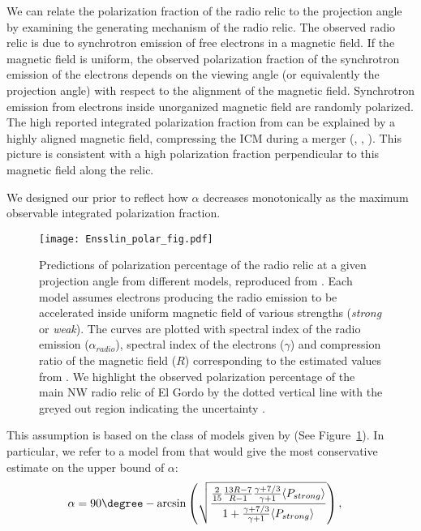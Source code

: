 We can relate the polarization fraction of the radio relic to the
projection angle by examining the
generating mechanism of the radio relic.
The observed radio relic is due to synchrotron emission of free electrons in a
magnetic field. If the magnetic field is uniform, the observed
polarization fraction of the synchrotron emission of the electrons depends on the
viewing angle (or equivalently the projection angle) with respect to the alignment of the magnetic field. 
Synchrotron emission from electrons inside unorganized magnetic field are
randomly polarized. The high reported integrated polarization fraction from
\citet{L13} can be explained by a highly aligned magnetic field,
compressing the ICM during a merger
(\citealt{E98}, \citealt{vanWeeren10}, \citealt{Feretti12}).
This picture is consistent with a high polarization fraction perpendicular
to this magnetic field along the relic. 
\par
We designed our prior to reflect how $\alpha$ decreases monotonically as the
maximum observable integrated polarization fraction. 
\begin{figure}
	\texttt{[image: Ensslin\_polar\_fig.pdf]}
	\caption{Predictions of polarization percentage of the radio relic at a
		given projection angle from different models, reproduced from
		\citealt{E98}. Each model assumes electrons producing the radio emission
		to be accelerated inside uniform magnetic field of various strengths ({\it strong} or 
		{\it weak}). The curves are plotted with spectral index of the radio emission
		($\alpha_{radio}$), spectral index of the electrons ($\gamma$) and
		compression ratio of the magnetic field ($R$) corresponding to the
		estimated values from \citet{L13}.
		We highlight the observed polarization percentage of the main NW radio relic
		of El Gordo by the dotted vertical line with the greyed out region
		indicating the uncertainty \citep{L13}.\label{fig:Ensslin_fig}}
\end{figure}
This assumption is based on the class of models given by \cite{E98}(See
Figure~\ref{fig:Ensslin_fig}). In particular, we refer to a model from \cite{E98} 
that would give the most
conservative estimate on the upper bound of $\alpha$:
\begin{align}
\alpha &= 90 \degree -
\arcsin
\left(
\sqrt{
\frac{
	\frac{2}{15} \frac{13R - 7}{R - 1} \frac{\gamma + 7/3}{\gamma + 1}
	\langle P_{strong} \rangle}{
	1 + \frac{\gamma + 7/3}{ \gamma +1} \langle P_{strong} \rangle }}\right),
\end{align}

